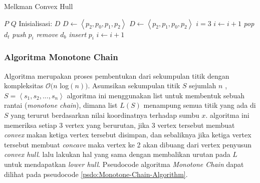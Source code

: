 \begin{algorithm}
	\caption{Melkman Convex Hull}
	\label{psdo:Melkman-Convex-Hull}
	\begin{algorithmic}[1]
		\Require $P$
		\Ensure $Q$
        \State Inisialisasi: $D$
            \State$D \leftarrow \left \langle p_2, p_0, p_1, p_2 \right \rangle$
        \Else
            \State $D \leftarrow \left \langle p_2, p_1, p_0, p_2 \right \rangle$
        \EndIf
        \State $i=3$
                \State $i \leftarrow i+1$
            \EndWhile
                \State \textit{pop} $d_t$
            \EndWhile
            \State \textit{push} $p_i$
                \State \textit{remove} $d_b$
            \EndWhile
            \State \textit{insert} $p_i$
            \State $i \leftarrow i+1$
        \EndWhile
	\end{algorithmic}
\end{algorithm}

\subsubsection{Algoritma Monotone Chain}
\label{sec:algoritma-monotone-chain}
Algoritma \MC merupakan proses pembentukan \CH dari sekumpulan titik dengan kompleksitas $\mathcal{O}(n$ log$(n))$\cite{monotone_chain_algorithm}. Asumsikan sekumpulan titik $S$ sejumlah $n$ ,$S = \left \langle s_1, s_2, ..., s_n\right \rangle$ algoritma ini menggunakan list untuk membentuk sebuah rantai (\textit{monotone chain}), dimana list $L(S)$ menampung semua titik yang ada di $S$ yang terurut berdasarkan nilai koordinatnya terhadap sumbu $x$. algoritma ini memeriksa setiap 3 vertex yang berurutan, jika 3 vertex tersebut membuat \textit{convex} makan ketiga vertex tersebut disimpan, dan sebaliknya jika ketiga vertex tersebut membuat \textit{concave} maka vertex ke 2 akan dibuang dari vertex penyusun \textit{convex hull}. lalu lakukan hal yang sama dengan membalikan urutan pada $L$ untuk mendapatkan \textit{lower hull}. Pseudocode algoritma \textit{Monotone Chain} dapat dilihat pada pseudocode \ref{psdo:Monotone-Chain-Algorithm}.

